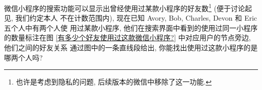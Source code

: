 \documentclass[10pt,UTF8]{book} %
\begin{document}
\begin{example}
    微信小程序的搜索功能可以显示出曾经使用过某款小程序的好友数\footnote{
        也许是考虑到隐私的问题, 后续版本的微信中移除了这一功能.
    } (便于讨论起见, 我们约定本人
    不在计数范围内), 现在已知 Avory, Bob, Charles, Devon 和 Eric 五个人中有两个人使
    用过某款小程序, 他们在搜索界面中看到的使用过同一小程序的数量标注在图 \ref{有多少个好友使用过这款微信小程序?} 
    中对应用户的节点旁边, 他们之间的好友关系
    通过图中的一条直线段给出, 你能找出使用过这款小程序的是哪两个人吗?
    \begin{figure}[H]
        \centering
            


        \begin{tikzpicture}[x=0.75pt,y=0.75pt,yscale=-1,xscale=1]


\end{tikzpicture}
\end{figure}
\end{example}
\end{document}
